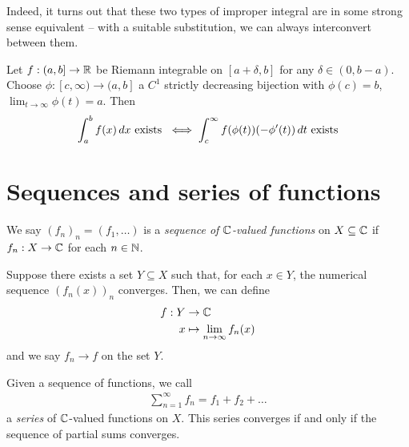 \documentclass{../template/note}
\begin{document}
    Indeed, it turns out that these two types of improper integral are in some strong sense equivalent -- with a suitable substitution, we can always interconvert between them.

    \begin{lemma}
        Let \(f: (a, b] \to \mathbb R\) be Riemann integrable on \([a+\delta, b]\) for any \(\delta \in (0, b-a)\). Choose \(\phi: [c, \infty) \to (a, b]\) a \(C^1\) strictly decreasing bijection with \(\phi(c) = b\), \(\lim_{t \to \infty}\phi(t) = a\). Then
        \begin{align*}
            \int_a^b f(x) \,d{x} \text{ exists } \iff \int_c^\infty f(\phi(t))(-\phi'(t)) \,d{t} \text{ exists}
        \end{align*}
    \end{lemma}
    

    \section{Sequences and series of functions}

    \begin{definition}
        We say \((f_n)_n = (f_1, \dots)\) is a \emph{sequence of \(\mathbb C\)-valued functions} on \(X \subseteq \mathbb C\) if \(f_n: X \to \mathbb C\) for each \(n \in \mathbb N\). 
    \end{definition}

    \begin{definition}
        Suppose there exists a set \(Y \subseteq X\) such that, for each \(x \in Y\), the numerical sequence \((f_n(x))_n\) converges. Then, we can define
        \begin{align*}
            f: Y &\to \mathbb C \\
            x &\mapsto \lim_{n \to \infty} f_n(x)
        \end{align*}
        and we say \(f_n \to f\) on the set \(Y\).        
    \end{definition}
    
    \begin{definition}
        Given a sequence of functions, we call
        \begin{align*}
            \sum_{n=1}^\infty f_n = f_1 + f_2 + \dots
        \end{align*}
        a \emph{series} of \(\mathbb C\)-valued functions on \(X\). This series converges if and only if the sequence of partial sums converges.    
    \end{definition}
    
\end{document}
